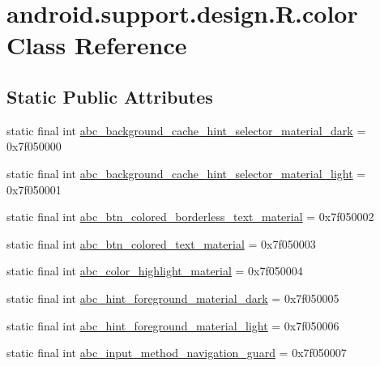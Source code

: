 \hypertarget{classandroid_1_1support_1_1design_1_1R_1_1color}{}\section{android.\+support.\+design.\+R.\+color Class Reference}
\label{classandroid_1_1support_1_1design_1_1R_1_1color}
\subsection*{Static Public Attributes}
\begin{DoxyCompactItemize}
\item 
static final int \mbox{\hyperlink{classandroid_1_1support_1_1design_1_1R_1_1color_a3bc2369d5b8b40574722eba1c4ed66e8}{abc\+\_\+background\+\_\+cache\+\_\+hint\+\_\+selector\+\_\+material\+\_\+dark}} = 0x7f050000
\item 
static final int \mbox{\hyperlink{classandroid_1_1support_1_1design_1_1R_1_1color_a836a7fae9079ef65b027b79704cebc14}{abc\+\_\+background\+\_\+cache\+\_\+hint\+\_\+selector\+\_\+material\+\_\+light}} = 0x7f050001
\item 
static final int \mbox{\hyperlink{classandroid_1_1support_1_1design_1_1R_1_1color_a92647d146b5c02cd7b7ca24f4206ae80}{abc\+\_\+btn\+\_\+colored\+\_\+borderless\+\_\+text\+\_\+material}} = 0x7f050002
\item 
static final int \mbox{\hyperlink{classandroid_1_1support_1_1design_1_1R_1_1color_a4d85412943ac3b26bc869cc43b3b9c06}{abc\+\_\+btn\+\_\+colored\+\_\+text\+\_\+material}} = 0x7f050003
\item 
static final int \mbox{\hyperlink{classandroid_1_1support_1_1design_1_1R_1_1color_aa538e5e8510d682489fe209c4455e24a}{abc\+\_\+color\+\_\+highlight\+\_\+material}} = 0x7f050004
\item 
static final int \mbox{\hyperlink{classandroid_1_1support_1_1design_1_1R_1_1color_ae972150834d21dd435f3b1a076b2ec5c}{abc\+\_\+hint\+\_\+foreground\+\_\+material\+\_\+dark}} = 0x7f050005
\item 
static final int \mbox{\hyperlink{classandroid_1_1support_1_1design_1_1R_1_1color_a8e600497f2479110bb0fda5f511c7e6d}{abc\+\_\+hint\+\_\+foreground\+\_\+material\+\_\+light}} = 0x7f050006
\item 
static final int \mbox{\hyperlink{classandroid_1_1support_1_1design_1_1R_1_1color_a6bc1f7e07ac7632cfbed86d43f972968}{abc\+\_\+input\+\_\+method\+\_\+navigation\+\_\+guard}} = 0x7f050007

\end{DoxyCompactItemize}
